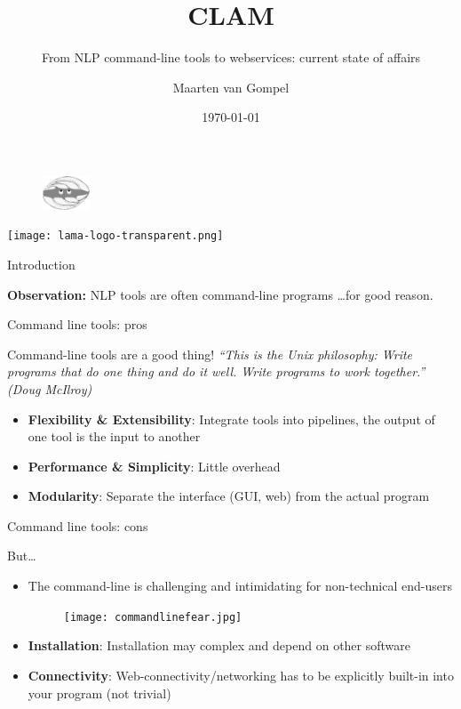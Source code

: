 \documentclass[xcolor=table,10pt,t]{beamer}
\title{CLAM}
\subtitle{From NLP command-line tools to webservices: current state of affairs}
\date{\today}
\author{Maarten van Gompel}
\begin{document}
\begin{frame}
    \titlepage{}
        \begin{figure}
        \includegraphics[height=1cm]{clamup_bw.png}
        \end{figure}
        \vspace{3.5cm}
    \texttt{[image: lama-logo-transparent.png]}
\end{frame}



\begin{frame}{Introduction}
  \begin{block}{}
    \textbf{Observation:} NLP tools are often command-line programs \ldots for
    good reason.
  \end{block}
\end{frame}



\begin{frame}{Command line tools: pros}
  \begin{block}{Command-line tools are a good thing!}
      \emph{``This is the Unix philosophy: Write programs that do one thing and do
      it well. Write programs to work together.'' (Doug McIlroy)}

      \medskip

      \begin{itemize}
        \item \textbf{Flexibility \& Extensibility}: Integrate tools into pipelines, the output of one tool is the input to another
        \item \textbf{Performance \& Simplicity}: Little overhead
        \item \textbf{Modularity}: Separate the interface (GUI, web) from the actual program
      \end{itemize}

  \end{block}

\end{frame}


\begin{frame}{Command line tools: cons}
  \begin{block}{But\ldots}
      \begin{itemize}
        \item The command-line is challenging and intimidating for non-technical end-users
        \begin{figure}
            \texttt{[image: commandlinefear.jpg]}
        \end{figure}
        \item \textbf{Installation}: Installation may complex and depend on other software
        \item \textbf{Connectivity}: Web-connectivity/networking has to be
            explicitly built-in into your program (not trivial)
      \end{itemize}
  \end{block}
\end{frame}
\end{document}

